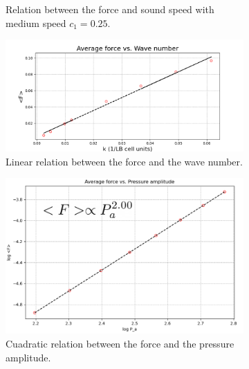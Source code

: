 \begin{figure}
\begin{subfigure}{0.35\textwidth}
    \caption{Relation between the force and sound speed with medium speed $c_1=0.25$.}
    \label{fig:radius}
    \end{subfigure}
    \begin{subfigure}{0.4\textwidth}
    \centering
    \includegraphics[width=\textwidth]{images/Results/ResultWaveNumber.PNG}
    \caption{Linear relation between the force and the wave number.}
    \label{fig:wavenumber}
    \end{subfigure}
    \begin{subfigure}{0.35\textwidth}
    \centering
    \includegraphics[width=\textwidth]{images/Results/PressureAmplitude.PNG}
    \caption{Cuadratic relation between the force and the pressure amplitude.}
    \label{fig:amplitude}
    \end{subfigure}
    \begin{subfigure}{0.4\textwidth}
    \centering

\end{subfigure}
\end{figure}
